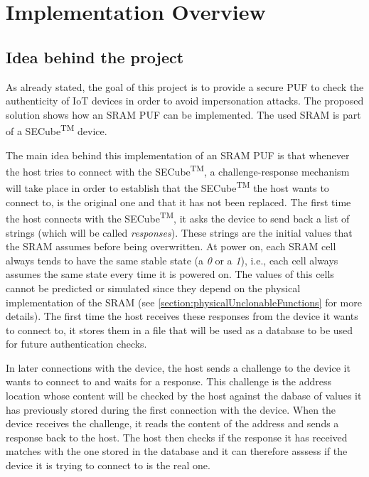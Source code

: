 \chapter{Implementation Overview}

\section {Idea behind the project} 
As already stated, the goal of this project is to provide a secure PUF to check the authenticity of IoT devices in order to avoid impersonation attacks. The proposed solution shows how an SRAM PUF can be implemented. The used SRAM is part of a SECube\textsuperscript{TM} device.

The main idea behind this implementation of an SRAM PUF is that whenever the host tries to connect with the SECube\textsuperscript{TM}, a challenge-response mechanism will take place in order to establish that the SECube\textsuperscript{TM} the host wants to connect to, is the original one and that it has not been replaced. 
The first time the host connects with the SECube\textsuperscript{TM}, it asks the device to send back a list of strings (which will be called \emph{responses}). These strings are the initial values that the SRAM assumes before being overwritten. At power on, each SRAM cell always tends to have the same stable state (a \emph{0} or a \emph{1}), i.e., each cell always assumes the same state every time it is powered on. The values of this cells cannot be predicted or simulated since they depend on the physical implementation of the SRAM (see \ref{section:physicalUnclonableFunctions} for more details). 
The first time the host receives these responses from the device it wants to connect to, it stores them in a file that will be used as a database to be used for future authentication checks.

In later connections with the device, the host sends a challenge to the device it wants to connect to and waits for a response. This challenge is the address location whose content will be checked by the host against the dabase of values it has previously stored during the first connection with the device. When the device receives the challenge, it reads the content of the address and sends a response back to the host. The host then checks if the response it has received matches with the one stored in the database and it can therefore asssess if the device it is trying to connect to is the real one.


